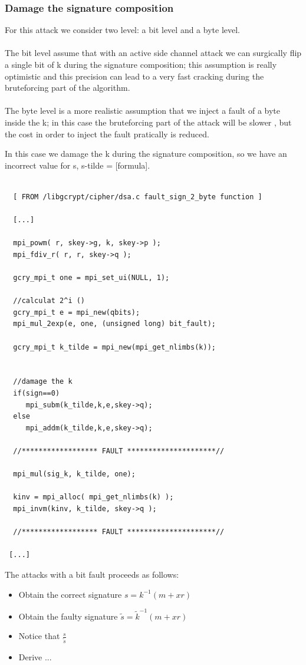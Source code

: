 \documentclass[11pt,english]{article}
\begin{document}
\subsubsection{Damage the signature composition}

For this attack we consider two level: a bit level and a byte level.\\\\ The bit level assume that with an active side channel attack we can surgically flip a single bit of k during the signature composition; this assumption is really optimistic and this precision can lead to a very fast cracking during the bruteforcing part of the algorithm.\\\\ The byte level is a more realistic assumption that we inject a fault of a byte inside the k; in this case the bruteforcing part of the attack will be slower , but the cost in order to inject the fault pratically is reduced.

In this case we damage the k during the signature composition, so we have an incorrect value for s, s-tilde = [formula].

\begin{lstlisting}
 
  [ FROM /libgcrypt/cipher/dsa.c fault_sign_2_byte function ]

  [...]
  
  mpi_powm( r, skey->g, k, skey->p );
  mpi_fdiv_r( r, r, skey->q );

  gcry_mpi_t one = mpi_set_ui(NULL, 1); 

  //calculat 2^i ()
  gcry_mpi_t e = mpi_new(qbits);
  mpi_mul_2exp(e, one, (unsigned long) bit_fault);  

  gcry_mpi_t k_tilde = mpi_new(mpi_get_nlimbs(k));
  

  //damage the k
  if(sign==0)
     mpi_subm(k_tilde,k,e,skey->q);  
  else
     mpi_addm(k_tilde,k,e,skey->q);

  //****************** FAULT *********************//
  
  mpi_mul(sig_k, k_tilde, one);
  
  kinv = mpi_alloc( mpi_get_nlimbs(k) );
  mpi_invm(kinv, k_tilde, skey->q );
  
  //****************** FAULT *********************//
  
 [...]

\end{lstlisting}

The attacks with a bit fault proceeds as follows: 
\begin{itemize}
\item Obtain the correct signature $s = k^{-1}(m + xr) $
\item Obtain the faulty signature $\tilde{s} = \tilde{k}^{-1}(m + xr)$
\item Notice that $\frac{s}{\tilde{s}}$
\item Derive ...
\end{itemize}
\end{document}
